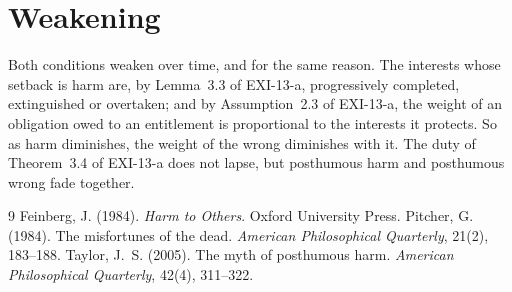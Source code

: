 \documentclass{situationist-preprint}
\begin{document}
\section{Weakening}

Both conditions weaken over time, and for the same reason. The interests whose setback is harm are, by Lemma~3.3 of EXI-13-a, progressively completed, extinguished or overtaken; and by Assumption~2.3 of EXI-13-a, the weight of an obligation owed to an entitlement is proportional to the interests it protects. So as harm diminishes, the weight of the wrong diminishes with it. The duty of Theorem~3.4 of EXI-13-a does not lapse, but posthumous harm and posthumous wrong fade together.

\begin{thebibliography}{9}\small
{} Feinberg, J. (1984). \emph{Harm to Others}. Oxford University Press.
 Pitcher, G. (1984). The misfortunes of the dead. \emph{American Philosophical Quarterly}, 21(2), 183--188.
 Taylor, J.~S. (2005). The myth of posthumous harm. \emph{American Philosophical Quarterly}, 42(4), 311--322.
\end{thebibliography}
\end{document}
